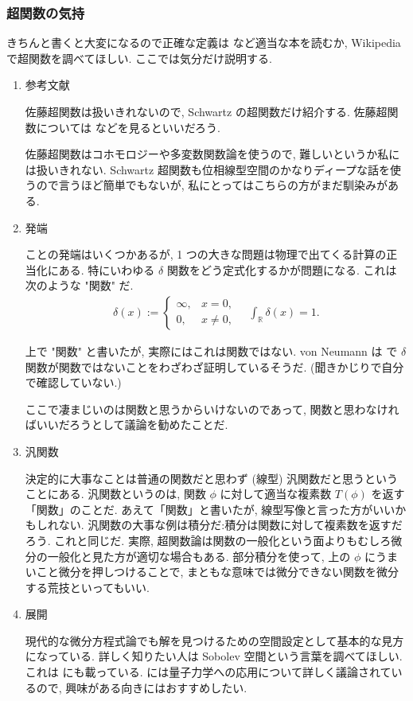 \documentclass[openany, a4paper, oneside]{jsbook}
\begin{document}
\subsubsection{超関数の気持}

きちんと書くと大変になるので正確な定義は \cite{LiebLoss1} など適当な本を読むか, Wikipedia で超関数を調べてほしい.
ここでは気分だけ説明する.
\begin{enumerate}
\item 参考文献

佐藤超関数は扱いきれないので, Schwartz の超関数だけ紹介する.
佐藤超関数については \cite{MitsuoMorimoto1} などを見るといいだろう.

佐藤超関数はコホモロジーや多変数関数論を使うので, 難しいというか私には扱いきれない.
Schwartz 超関数も位相線型空間のかなりディープな話を使うので言うほど簡単でもないが,
私にとってはこちらの方がまだ馴染みがある.
\item 発端

ことの発端はいくつかあるが, 1 つの大きな問題は物理で出てくる計算の正当化にある.
特にいわゆる $\delta$ 関数をどう定式化するかが問題になる.
これは次のような "関数" だ.
\begin{align}
 \delta (x)
 :=
 \begin{cases}
  \infty, & x = 0, \\
  0, & x \neq 0,
 \end{cases} \quad
 \int_{\mathbb{R}} \delta (x) = 1.
\end{align}

上で "関数" と書いたが, 実際にはこれは関数ではない.
von Neumann は \cite{vonNeumann1} で $\delta$ 関数が関数ではないことをわざわざ証明しているそうだ.
(聞きかじりで自分で確認していない.)

ここで凄まじいのは関数と思うからいけないのであって,
関数と思わなければいいだろうとして議論を勧めたことだ.
\item 汎関数

決定的に大事なことは普通の関数だと思わず (線型) 汎関数だと思うということにある.
汎関数というのは, 関数 $\phi$ に対して適当な複素数 $T (\phi)$ を返す「関数」のことだ.
あえて「関数」と書いたが, 線型写像と言った方がいいかもしれない.
汎関数の大事な例は積分だ:積分は関数に対して複素数を返すだろう.
これと同じだ.
実際, 超関数論は関数の一般化という面よりもむしろ微分の一般化と見た方が適切な場合もある.
部分積分を使って, 上の $\phi$ にうまいこと微分を押しつけることで,
まともな意味では微分できない関数を微分する荒技といってもいい.
\item 展開

現代的な微分方程式論でも解を見つけるための空間設定として基本的な見方になっている.
詳しく知りたい人は Sobolev 空間という言葉を調べてほしい.
これは \cite{LiebLoss1} にも載っている.
\cite{LiebLoss1} には量子力学への応用について詳しく議論されているので, 興味がある向きにはおすすめしたい.
\end{enumerate}
\end{document}
